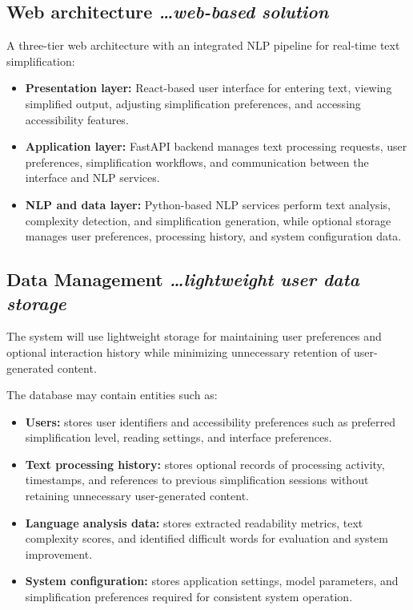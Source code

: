 \documentclass[11pt,a4paper]{article}
\newcommand{\BvrHint}[1]{%
  {\normalfont\normalsize\itshape\hfill #1}}
\begin{document}
\subsection{Web architecture %
\BvrHint{\ldots web-based solution}}

A three-tier web architecture with an integrated NLP pipeline for real-time text simplification:

\begin{itemize}[leftmargin=0.7cm]

    \item \textbf{Presentation layer:} React-based user interface for entering text, viewing simplified output, adjusting simplification preferences, and accessing accessibility features.

    \item \textbf{Application layer:} FastAPI backend manages text processing requests, user preferences, simplification workflows, and communication between the interface and NLP services.

    \item \textbf{NLP and data layer:} Python-based NLP services perform text analysis, complexity detection, and simplification generation, while optional storage manages user preferences, processing history, and system configuration data.

\end{itemize}
\subsection{Data Management %
\BvrHint{\ldots lightweight user data storage}}

The system will use lightweight storage for maintaining user preferences and optional interaction history while minimizing unnecessary retention of user-generated content.

The database may contain entities such as:

\begin{itemize}[leftmargin=0.7cm]

    \item \textbf{Users:} stores user identifiers and accessibility preferences such as preferred simplification level, reading settings, and interface preferences.

    \item \textbf{Text processing history:} stores optional records of processing activity, timestamps, and references to previous simplification sessions without retaining unnecessary user-generated content.

    \item \textbf{Language analysis data:} stores extracted readability metrics, text complexity scores, and identified difficult words for evaluation and system improvement.

    \item \textbf{System configuration:} stores application settings, model parameters, and simplification preferences required for consistent system operation.

\end{itemize}
\end{document}
